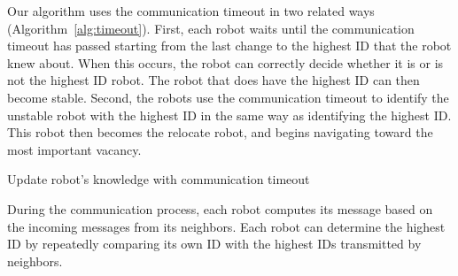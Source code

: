 Our algorithm uses the communication timeout in two related ways (Algorithm~\ref{alg:timeout}).
%
First, each robot waits until the communication timeout has passed starting from the
last change to the highest ID that the robot knew about.  
%
When this occurs,
the robot can correctly decide whether it is or is not the highest ID robot.
%
The robot that does have the highest ID can then become stable.
%
Second, the robots use the communication timeout to identify
the unstable robot with the highest ID in the same way as identifying the highest ID.  
%
This robot then becomes the relocate
robot, and begins navigating toward the most important vacancy.

\begin{algorithm}
{}
\Input{\MyPreMsg, \MyCurMsg, \TIMEOUT}
  \caption{Update robot's knowledge with communication timeout}
  \label{alg:timeout}
\end{algorithm}


During the communication process, each robot computes its message
based on the incoming messages from its neighbors. 
%
Each robot can determine the highest ID by repeatedly comparing its own ID with the highest IDs transmitted by neighbors.
%

